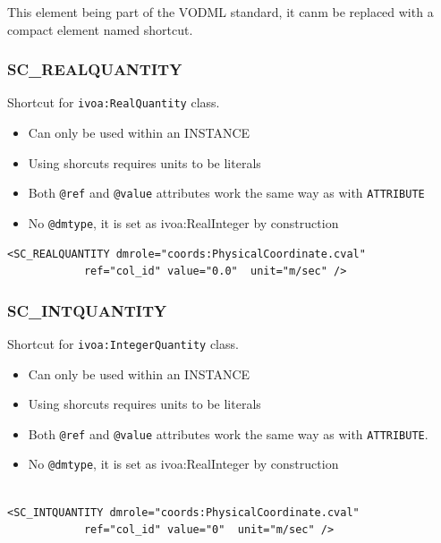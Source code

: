\documentclass[11pt,a4paper]{ivoa}
\begin{document}
This element being part  of the VODML standard, it canm be replaced with a compact element named shortcut.


\subsubsection{SC\_REALQUANTITY}
Shortcut for \texttt{ivoa:RealQuantity} class.

\begin{itemize}
    \item Can only be used within an INSTANCE      
    \item Using shorcuts requires units to be literals   
    \item Both \texttt{@ref} and \texttt{@value} attributes work the same way as with \texttt{ATTRIBUTE}
    \item No \texttt{@dmtype},  it is set as ivoa:RealInteger by construction
 \end{itemize}


\begin{lstlisting}[caption={\texttt{ivoa:RealQuantity} example},style=XML]
<SC_REALQUANTITY dmrole="coords:PhysicalCoordinate.cval"
            ref="col_id" value="0.0"  unit="m/sec" />
\end{lstlisting}


\subsubsection{SC\_INTQUANTITY}
Shortcut for \texttt{ivoa:IntegerQuantity} class.

\begin{itemize}
    \item Can only be used within an INSTANCE        
    \item Using shorcuts requires units to be literals    
    \item Both \texttt{@ref} and \texttt{@value} attributes work the same way as with \texttt{ATTRIBUTE}.
    \item No \texttt{@dmtype},  it is set as ivoa:RealInteger by construction
 \end{itemize}


\begin{lstlisting}[caption={\texttt{ivoa:IntegerQuantity} example},style=XML,basicstyle=\small]

<SC_INTQUANTITY dmrole="coords:PhysicalCoordinate.cval"
            ref="col_id" value="0"  unit="m/sec" />
\end{lstlisting}
\end{document}
